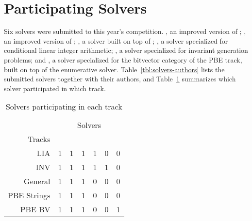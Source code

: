 \section{Participating Solvers}
\label{sec:solvers}

Six solvers were submitted to this year's competition. \eusolvernew, an improved version of \eusolver;  \cvcnew, an improved version of \cvc; \euphony, a solver built on top of \eusolver; \dryd, a solver specialized for conditional linear integer arithmetic;  \lig, a solver specialized for invariant generation problems; and \ethree, a solver specialized for the bitvector category of the PBE track, built on top of the enumerative solver.
Table~\ref{tbl:solvers-authors} lists the submitted solvers together with their authors, and Table~\ref{tbl:solvers-in-tracks} summarizes which solver participated in which track.

\begin{table}[b]
	{\small{
			\begin{center}
			\end{center}
			\caption{Submitted Solvers }
			\label{tbl:solvers-authors}
		}}
\end{table}


\begin{table}[t]
	\begin{center}
		\begin{tabular}{r||rrrrrr}
			& \multicolumn{6}{c}{Solvers} \\
			Tracks & \rot{\eusolvernew} & \rot{\cvcnew} & \rot{\euphony} & \rot{\dryd} & \rot{\lig} & \rot{\ethree} \\ \hline \hline
			LIA         & 1 & 1 & 1 & 1 & 0 & 0 \\
			INV         & 1 & 1 & 1 & 1 & 1 & 0\\
			General     & 1 & 1 & 1 & 0 & 0 & 0\\ 
			PBE Strings & 1 & 1 & 1 & 0 & 0 & 0\\ 
			PBE BV      & 1 & 1 & 1 & 0 & 0 & 1
		\end{tabular}
	\end{center}
	\caption{Solvers participating in each track}
	\label{tbl:solvers-in-tracks}
\end{table}


